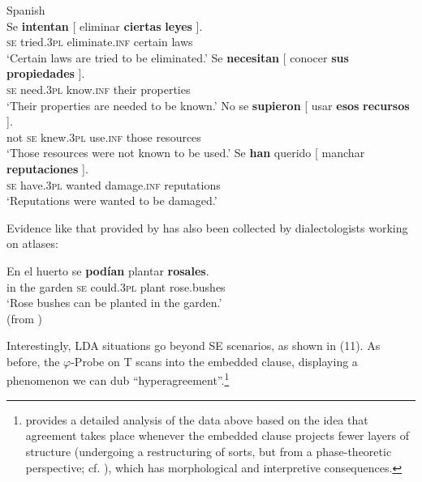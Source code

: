 \documentclass[output=paper]{langsci/langscibook}
\begin{document}
\ea%
    Spanish\label{ex:gallego:9}\\
    \ea
    \gll Se  \textbf{intentan}  [ eliminar        \textbf{ciertas}  \textbf{leyes} ].        \\
         \textsc{se} tried\textsc{{}.3pl} {}  eliminate.\textsc{inf}  certain   laws\\
    \glt ‘Certain laws are tried to be eliminated.’  
    \ex
    \gll Se  \textbf{necesitan}  [ conocer     \textbf{sus}    \textbf{propiedades} ].         \\
            \textsc{se}  need\textsc{{}.3pl} {}  know.\textsc{inf}   their  properties\\
    \glt    ‘Their properties are needed to be known.’
    \ex
    \gll No se   \textbf{supieron}  [ usar        \textbf{esos}    \textbf{recursos} ].        \\
            not \textsc{se} knew\textsc{{}.3pl} {}   use.\textsc{inf}   those   resources\\
    \glt    ‘Those resources were not known to be used.’
    \ex
    \gll  Se   \textbf{han}           querido [ manchar        \textbf{reputaciones} ].     \\
            \textsc{se} have\textsc{{}.3pl} wanted {}   damage.\textsc{inf}   reputations\\
    \glt     ‘Reputations were wanted to be damaged.’
    \z
\z

Evidence like that provided by \citet{RAE-ASALE2009} has also been collected by dialectologists working on atlases:

\ea%
\gll En el huerto se \textbf{podían} plantar \textbf{rosales}.\\
in the garden \textsc{se} could.\textsc{3pl} plant rose.bushes\\
\glt ‘Rose bushes can be planted in the garden.’\\
(from \citealt[13]{Benito2010}) \\
\z

Interestingly, LDA situations go beyond SE scenarios, as shown in (11). As before, the $\varphi $-Probe on T scans into the embedded clause, displaying a phenomenon we can dub “hyperagreement”.\footnote{\citet{Fernández-Serrano2016} provides a detailed analysis of the data above based on the idea that agreement takes place whenever the embedded clause projects fewer layers of structure (undergoing a restructuring of sorts, but from a phase-theoretic perspective; cf. \citealt{Gallego2009}), which has morphological and interpretive consequences.} 
\end{document}
